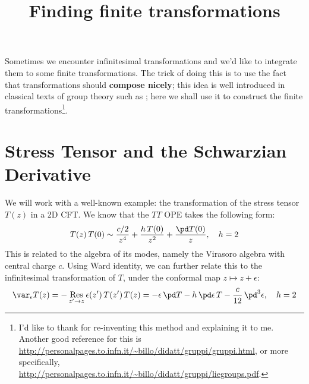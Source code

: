 \documentclass[a4paper
	,10pt
]{article}
\title{Finding finite transformations}
\begin{document}
\maketitle
{}
\thispagestyle{empty}

	Sometimes we encounter infinitesimal transformations and we'd like to integrate them to some finite transformations. The trick of doing this is to use the fact that transformations should \textbf{compose nicely}; this idea is well introduced in classical texts of group theory such as \textcite{wybourne1993classical}; here we shall use it to construct the finite transformations\footnote{
		I'd like to thank  for re-inventing this method and explaining it to me. Another good reference for this is \url{http://personalpages.to.infn.it/~billo/didatt/gruppi/gruppi.html}, or more specifically, \url{http://personalpages.to.infn.it/~billo/didatt/gruppi/liegroups.pdf}. 
	}. 

\setlength{\parskip}{.1\baselineskip}
\tableofcontents
\setlength{\parskip}{\parskipnorm}

\section{Stress Tensor and the Schwarzian Derivative}
	We will work with a well-known example: the transformation of the stress tensor $T(z)$ in a 2D CFT. We know that the $TT$ OPE takes the following form:
	\begin{equation}
		T(z)\,T(0)
		\sim \frac{c/2}{z^4}
			+ \frac{h\,T(0)}{z^2}
			+ \frac{\pd T(0)}{z},
	\quad h = 2
	\end{equation}
	This is related to the algebra of its modes, namely the Virasoro algebra with central charge $c$. Using Ward identity, we can further relate this to the infinitesimal transformation of $T$, under the conformal map $z\mapsto z+\epsilon$:
	\begin{equation}
		\var_\epsilon {T(z)}
		= - \operatorname*{Res}_{z'\to z}
				\epsilon(z')\,T(z')\,T(z)
		= - \epsilon\,\pd T
			- h\,\pd\epsilon\,T
			- \frac{c}{12}\,\pd^3 \epsilon,
	\quad h = 2
	\end{equation}
	
\end{document}
